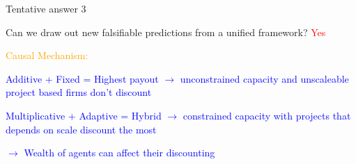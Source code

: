 \documentclass{beamer}
\numberwithin{equation}{section}
\begin{document}
\begin{frame}{Tentative answer 3}
\begin{itemize}
    \item Can we draw out new falsifiable predictions from a unified framework? \textcolor{red}{Yes}
    \item \textcolor{orange}{Causal Mechanism:} \textcolor{blue}{
    \item Additive + Fixed = Highest payout $\rightarrow$ unconstrained capacity and unscaleable project based firms don't discount
    \item Multiplicative + Adaptive = Hybrid $\rightarrow$ constrained capacity with projects that depends on scale discount the most
    \item $\rightarrow$ Wealth of agents can affect their discounting } 
\end{itemize}
\end{frame}

\end{document}
